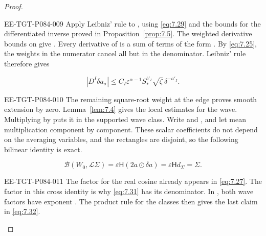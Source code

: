 \begin{proof}
\begin{EESegment}{EE-TGT-P084-009}
Apply Leibniz' rule to , using \eqref{eq:7.29} and the bounds for the differentiated inverse proved in Proposition~\ref{prop:7.5}. The weighted derivative bounds on  give . Every derivative of  is a sum of terms of the form . By \eqref{eq:7.25}, the  weights in the numerator cancel all but  in the denominator. Leibniz' rule therefore gives
\end{EESegment}
\begin{equation}
  |D^I\delta a_\sigma|
  \leq C_I\varepsilon^{\alpha-1}S_*^{b'_I}\sqrt{\zeta}\,\delta^{-a'_I}.
  \tag{7.33}\label{eq:7.33}
\end{equation}
\begin{EESegment}{EE-TGT-P084-010}
The remaining square-root weight at the edge proves smooth extension by zero. Lemma~\ref{lem:7.4} gives the local estimates for the wave. Multiplying by  puts it in the supported wave class. Write  and , and let  mean multiplication component by component. These scalar coefficients do not depend on the averaging variables, and the rectangles are disjoint, so the following bilinear identity is exact.
\end{EESegment}
\begin{equation}
  \mathcal B(W_0,\mathcal L\Sigma)
  =\varepsilon\mathsf H(2a\odot\delta a)=\varepsilon\mathsf Hd_\Sigma=\Sigma.
  \tag{7.34}\label{eq:7.34}
\end{equation}
\begin{EESegment}{EE-TGT-P084-011}
The factor  for the real cosine already appears in \eqref{eq:7.27}. The factor  in this cross identity is why \eqref{eq:7.31} has its denominator. In , both wave factors have exponent . The product rule for the classes then gives the last claim in \eqref{eq:7.32}.
\end{EESegment}
\end{proof}
